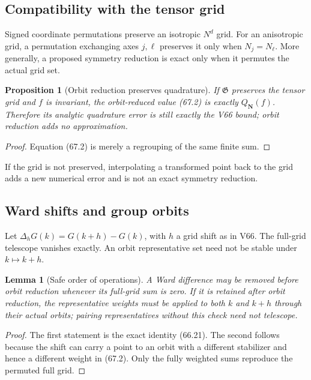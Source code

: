 \documentclass[11pt]{article}
\newtheorem{lemma}[theorem]{Lemma}
\newtheorem{proposition}[theorem]{Proposition}
\begin{document}
\subsection{Compatibility with the tensor grid}

Signed coordinate permutations preserve an isotropic \(N^d\) grid.
For an anisotropic grid, a permutation exchanging axes \(j,\ell\)
preserves it only when \(N_j=N_\ell\).  More generally, a proposed
symmetry reduction is exact only when it permutes the actual grid set.

\begin{proposition}[Orbit reduction preserves quadrature]
\label{prop:v11v67-quadrature}
If \({\mathfrak G}\) preserves the tensor grid and \(f\) is invariant,
the orbit-reduced value (67.2) is exactly
\(Q_{\boldsymbol N}(f)\).  Therefore its analytic quadrature error is
still exactly the V66 bound; orbit reduction adds no approximation.
\end{proposition}

\begin{proof}
Equation (67.2) is merely a regrouping of the same finite sum.
\end{proof}

If the grid is not preserved, interpolating a transformed point back
to the grid adds a new numerical error and is not an exact symmetry
reduction.

\subsection{Ward shifts and group orbits}

Let \(\Delta_hG(k)=G(k+h)-G(k)\), with \(h\) a grid shift as in V66.
The full-grid telescope vanishes exactly.  An orbit representative set
need not be stable under \(k\mapsto k+h\).

\begin{lemma}[Safe order of operations]
\label{lem:v11v67-order}
A Ward difference may be removed before orbit reduction whenever its
full-grid sum is zero.  If it is retained after orbit reduction, the
representative weights must be applied to both \(k\) and \(k+h\)
through their actual orbits; pairing representatives without this
check need not telescope.
\end{lemma}

\begin{proof}
The first statement is the exact identity (66.21).  The second follows
because the shift can carry a point to an orbit with a different
stabilizer and hence a different weight in (67.2).  Only the fully
weighted sums reproduce the permuted full grid.
\end{proof}
\end{document}
